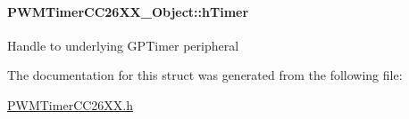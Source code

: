 \paragraph[{h\+Timer}]{ P\+W\+M\+Timer\+C\+C26\+X\+X\+\_\+\+Object\+::h\+Timer}\label{struct_p_w_m_timer_c_c26_x_x___object_a8ccd272d60d7cae93d6ab39d50b3a175}
Handle to underlying G\+P\+Timer peripheral 

The documentation for this struct was generated from the following file\+:\begin{DoxyCompactItemize}
\item 
\hyperlink{_p_w_m_timer_c_c26_x_x_8h}{P\+W\+M\+Timer\+C\+C26\+X\+X.\+h}\end{DoxyCompactItemize}

